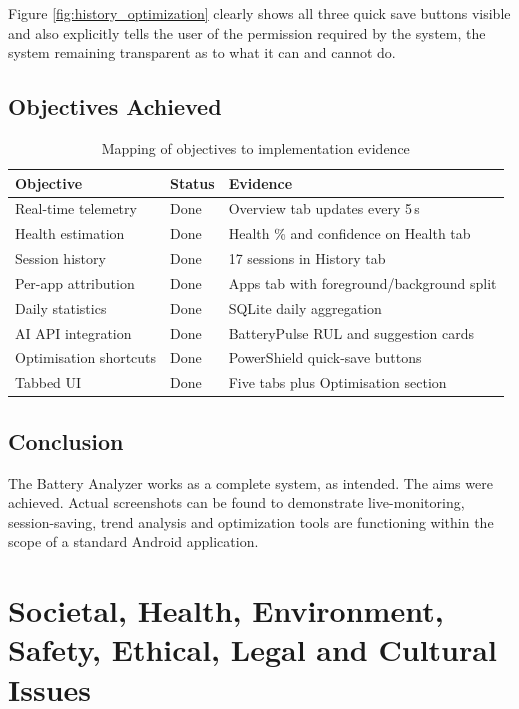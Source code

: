 \documentclass[12pt,a4paper]{report}
\begin{document}
Figure \ref{fig:history_optimization} clearly shows all three quick save buttons visible and also explicitly tells the user of the permission required by the system, the system remaining transparent as to what it can and cannot do.

\section{Objectives Achieved}

\begin{table}[H]
\caption{Mapping of objectives to implementation evidence}
\centering
\small
\begin{tabular}{lll}
\toprule
\textbf{Objective} & \textbf{Status} & \textbf{Evidence}\\
\midrule
Real-time telemetry    & Done & Overview tab updates every 5\,s\\
Health estimation      & Done & Health \% and confidence on Health tab\\
Session history        & Done & 17 sessions in History tab\\
Per-app attribution    & Done & Apps tab with foreground/background split\\
Daily statistics       & Done & SQLite daily aggregation\\
AI API integration     & Done & BatteryPulse RUL and suggestion cards\\
Optimisation shortcuts & Done & PowerShield quick-save buttons\\
Tabbed UI              & Done & Five tabs plus Optimisation section\\
\bottomrule
\end{tabular}
\end{table}

\section{Conclusion}

The Battery Analyzer works as a complete system, as intended. The aims were achieved. Actual screenshots can be found to demonstrate live-monitoring, session-saving, trend analysis and optimization tools are functioning within the scope of a standard Android application.

\chapter{Societal, Health, Environment, Safety, Ethical, Legal and Cultural Issues}
\end{document}
